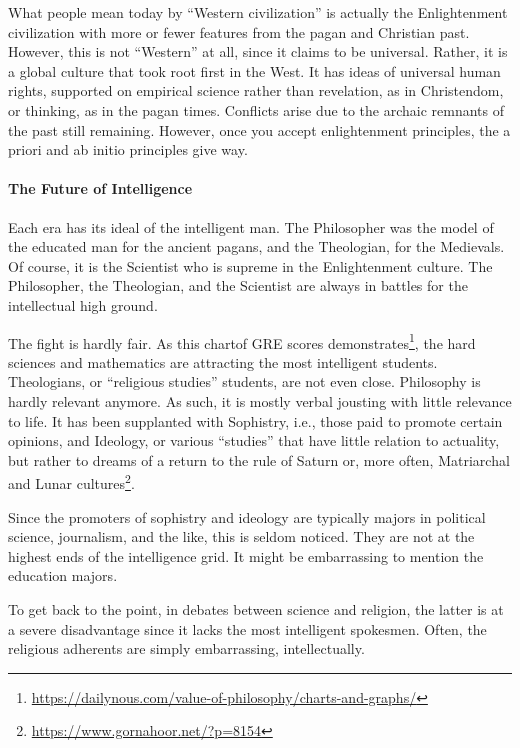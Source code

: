 What people mean today by ``Western civilization'' is actually the Enlightenment civilization with more or fewer features from the pagan and Christian past. However, this is not ``Western'' at all, since it claims to be universal. Rather, it is a global culture that took root first in the West. It has ideas of universal human rights, supported on empirical science rather than revelation, as in Christendom, or thinking, as in the pagan times. Conflicts arise due to the archaic remnants of the past still remaining. However, once you accept enlightenment principles, the a priori and ab initio principles give way.

\paragraph{The Future of Intelligence}


Each era has its ideal of the intelligent man. The Philosopher was the model of the educated man for the ancient pagans, and the Theologian, for the Medievals. Of course, it is the Scientist who is supreme in the Enlightenment culture. The Philosopher, the Theologian, and the Scientist are always in battles for the intellectual high ground.

The fight is hardly fair. As this chartof GRE scores demonstrates\footnote{\url{https://dailynous.com/value-of-philosophy/charts-and-graphs/}}, the hard sciences and mathematics are attracting the most intelligent students. Theologians, or ``religious studies'' students, are not even close. Philosophy is hardly relevant anymore. As such, it is mostly verbal jousting with little relevance to life. It has been supplanted with Sophistry, i.e., those paid to promote certain opinions, and Ideology, or various ``studies'' that have little relation to actuality, but rather to dreams of a return to the rule of Saturn or, more often, Matriarchal and Lunar cultures\footnote{\url{https://www.gornahoor.net/?p=8154}}.

Since the promoters of sophistry and ideology are typically majors in political science, journalism, and the like, this is seldom noticed. They are not at the highest ends of the intelligence grid. It might be embarrassing to mention the education majors.

To get back to the point, in debates between science and religion, the latter is at a severe disadvantage since it lacks the most intelligent spokesmen. Often, the religious adherents are simply embarrassing, intellectually.

